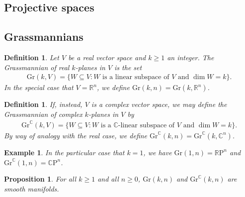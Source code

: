 \documentclass{amsart}          %
\newtheorem{proposition}[theorem]{Proposition}
\newtheorem{definition}[theorem]{Definition}
\newtheorem{example}[theorem]{Example}
\newcommand{\R}{\mathbb R}
\newcommand{\C}{\mathbb C}
\newcommand{\RP}{\mathbb{R}\mathrm{P}}
\newcommand{\CP}{\mathbb{C}\mathrm{P}}
\newcommand{\Gr}{\mathrm{Gr}}
\begin{document}
\subsection{Projective spaces}

\subsection{Grassmannians}
\begin{definition}
	Let $V$ be a real vector space and $k\geq 1$ an integer. The \textit{Grassmannian of real $k$-planes in $V$} is the set\begin{align*}
	\Gr(k,V)=\{W\subseteq V:\text{$W$ is a linear subspace of $V$ and $\dim W=k$}\}.
	\end{align*}
	In the special case that $V=\R^n$, we define $\Gr(k,n)=\Gr(k,\R^n)$.
\end{definition}
\begin{definition}
	If, instead, $V$ is a \textit{complex} vector space, we may define the \textit{Grassmannian of complex $k$-planes in $V$} by\begin{align*}
	\Gr^\C(k,V)=\{W\subseteq V:\text{$W$ is a $\C$-linear subspace of $V$ and $\dim W=k$}\}.
	\end{align*}
	By way of analogy with the real case, we define $\Gr^\C(k,n)=\Gr^\C(k,\C^n)$.
\end{definition}
\begin{example}
	In the particular case that $k=1$, we have $\Gr(1,n)=\RP^n$ and $\Gr^\C(1,n)=\CP^n$.
\end{example}
\begin{proposition}
	For all $k\geq 1$ and all $n\geq 0$, $\Gr(k,n)$ and $\Gr^\C(k,n)$ are smooth manifolds.
\end{proposition}
\end{document}
